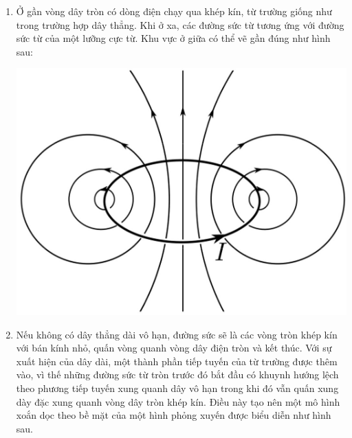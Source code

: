 \begin{loigiai}
\begin{enumerate}
\begin{enumerate}[1)]
\begin{center}
\begin{tikzpicture}[x=0.75pt,y=0.75pt,yscale=-1,xscale=1]
\end{tikzpicture}
\end{center}
\item Ở gần vòng dây tròn có dòng điện chạy qua khép kín, từ trường giống như trong trường hợp dây thẳng. Khi ở xa, các đường sức từ tương ứng với đường sức từ của một lưỡng cực từ. Khu vực ở giữa có thể vẽ gần đúng như hình sau:
\begin{center}
\includegraphics[scale=0.5]{Anh/Picture3 (2).jpg}
\end{center}
\item Nếu không có dây thẳng dài vô hạn, đường sức sẽ là các vòng tròn khép kín với bán kính nhỏ, quấn vòng quanh vòng dây điện tròn và kết thúc. Với sự xuất hiện của dây dài, một thành phần tiếp tuyến của từ trường được thêm vào, vì thế những đường sức từ tròn trước đó bắt đầu có khuynh hướng lệch theo phương tiếp tuyến xung quanh dây vô hạn trong khi đó vẫn quấn xung dày đặc xung quanh vòng dây tròn khép kín. Điều này tạo nên một mô hình xoắn dọc theo bề mặt của một hình phỏng xuyến được biểu diễn như hình sau.
\begin{center}

\end{center}
\end{enumerate}
\end{enumerate}
\end{loigiai}
